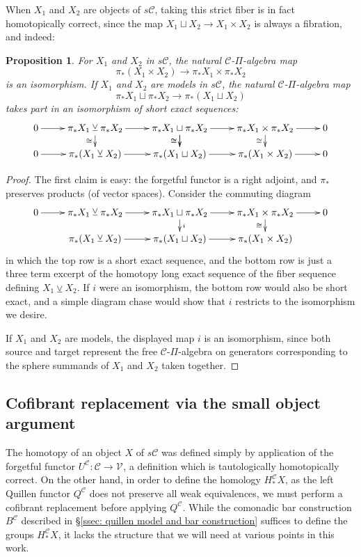 \documentclass[11pt]{amsart} \renewcommand{\baselinestretch}{1.4}
\theoremstyle{plain}
\newtheorem{prop}[thm]{Proposition}
\theoremstyle{definition}
\renewcommand{\to}{\longrightarrow}
\newcommand{\calV}{\mathcal{V}}
\newcommand{\calc}{\mathcal{C}}
\newcommand{\vect}[2]{\calV^{#1}_{#2}}
\newcommand{\smashcoprod}{\veebar}%
\begin{document}
\begin{Pi-algebras and cohomology algebras}
When $X_1$ and $X_2$ are  objects of $s\calc$, taking this strict fiber is in fact homotopically correct, since the map $X_1\sqcup X_2\to X_1\times X_2$ is always a fibration, and indeed:
\begin{prop}
\label{smash coprod}
For $X_1$ and $X_2$ in $s\calc$, the natural $\calc$-$\Pi$-algebra map
\[\pi_*(X_1\times X_2)\to \pi_* X_1\times \pi_* X_2\]
 is an isomorphism. If $X_1$ and $X_2$ are models in $s\calc$, the natural $\calc$-$\Pi$-algebra map 
\[\pi_* X_1\sqcup \pi_* X_2\to\pi_*(X_1\sqcup X_2)\]
takes part in an isomorphism of short exact sequences:
\[\xymatrix@R=4mm{
0\ar[r]&%
\pi_* X_1\smashcoprod \pi_* X_2
\ar[r]\ar[d]_-{\cong}
&%
\pi_* X_1\sqcup \pi_* X_2
\ar[r]
\ar[d]_-{\cong}\ar[d]_-{\cong}
&%
\pi_* X_1\times \pi_* X_2
\ar[r]
\ar[d]_-{\cong}
&%
0\\%
0\ar[r]&%
\pi_* (X_1\smashcoprod  X_2)
\ar[r]
&%
\pi_* (X_1\sqcup X_2)
\ar[r]
&%
\pi_* (X_1\times X_2)
\ar[r]&0
}\]
\end{prop}
\begin{proof}
The first claim is easy: the forgetful functor is a right adjoint, and $\pi_*$ preserves products (of vector spaces). Consider the commuting diagram
\[\xymatrix@R=4mm{
0\ar[r]&%
\pi_* X_1\smashcoprod \pi_* X_2
\ar[r]
&%
\pi_* X_1\sqcup \pi_* X_2
\ar[r]
\ar[d]^-{i}
&%
\pi_* X_1\times \pi_* X_2
\ar[r]
\ar[d]_-{\cong}
&%
0\\%
&%
\pi_* (X_1\smashcoprod  X_2)
\ar[r]
&%
\pi_* (X_1\sqcup X_2)
\ar[r]
&%
\pi_* (X_1\times X_2)
}\]
in which the top row is a short exact sequence, and the bottom row is just a three term excerpt of the homotopy long exact sequence of the fiber sequence defining $X_1\smashcoprod X_2$. If $i$ were an isomorphism, the bottom row would also be short exact, and a simple diagram chase would show that $i$ restricts to the isomorphism we desire.


If $X_1$ and $X_2$ are models, the displayed map $i$ is an isomorphism, since both source and target represent the free $\calc$-$\Pi$-algebra on generators corresponding to the sphere summands of $X_1$ and $X_2$ taken together. 
\end{proof}

\subsection{Cofibrant replacement via the small object argument}\label{Cofibrant replacement via the small object argument}
The homotopy of an object $X$ of $s\calc$ was defined simply by application of the forgetful functor $U^{\calc}:\calc\to\vect{}{}$, a definition which is tautologically homotopically correct. On the other hand, in order to define the homology $H_*^{\calc}X$, as the left Quillen functor $Q^{\calc}$ does not preserve all weak equivalences, we must perform a cofibrant replacement before applying $Q^{\calc}$. While the comonadic bar construction $B^{\calc}$ described in \S\ref{ssec: quillen model and bar construction} suffices to define the groups $H_*^{\calc}X$, it lacks the structure that we will need at various points in this work.


\end{Pi-algebras and cohomology algebras}
\end{document}
